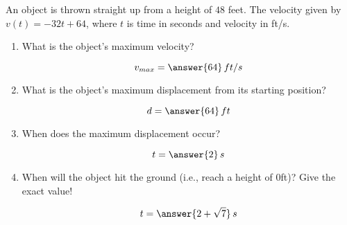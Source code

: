 \documentclass{ximera}
\author{Gregory Hartman \and Matthew Carr}
\begin{document}
\begin{exercise}

An object is thrown straight up from a height of $48$ feet.  The velocity given by
$v(t)=-32t+64$, where $t$ is time in seconds and velocity in ft/s.

\begin{enumerate}
\item What is the object's maximum velocity? \begin{prompt}\[v_{max}=\answer{64}\,ft/s\]\end{prompt}
\item What is the object's maximum displacement from its starting position? \begin{prompt}\[d=\answer{64}\,ft\]\end{prompt}
\item When does the maximum displacement occur? \begin{prompt}\[t=\answer{2}\,s\]\end{prompt}
\item When will the object  hit the ground (i.e., reach a height of $0$ft)? Give the  exact value! \begin{prompt}\[t=\answer{2+\sqrt{7}}\,s\]\end{prompt}
\end{enumerate}

\end{exercise}
\end{document}
